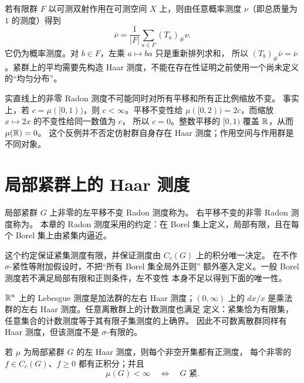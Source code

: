 \begin{example}[有限群平均]
若有限群 $F$ 以可测双射作用在可测空间 $X$ 上，则由任意概率测度
$\nu$（即总质量为 $1$ 的测度）得到
\[
 \overline\nu=\frac1{|F|}\sum_{a\in F}(T_a)_\#\nu.
\]
它仍为概率测度。对 $b\in F$，左乘 $a\mapsto ba$ 只是重新排列求和，
所以 $(T_b)_\#\overline\nu=\overline\nu$。紧群上的平均需要先构造
Haar 测度，不能在存在性证明之前使用一个尚未定义的“均匀分布”。
\end{example}

\begin{counterexample}[仿射作用的限制]
实直线上的非零 Radon 测度不可能同时对所有平移和所有正比例缩放不变。
事实上，若 $c=\mu([0,1))$，则 $c<\infty$。平移不变性给
$\mu([0,2))=2c$，而缩放 $x\mapsto2x$ 的不变性给同一数值为 $c$，
所以 $c=0$。整数平移的 $[0,1)$ 覆盖 $\mathbb{R}$，从而 $\mu(\mathbb{R})=0$。
这个反例并不否定仿射群自身存在 Haar 测度；作用空间与作用群是不同对象。
\end{counterexample}

\section{局部紧群上的 Haar 测度}
\label{sec:haar-measure-definition}

\begin{definition}
局部紧群 $G$ 上非零的左平移不变 Radon 测度称为。
右平移不变的非零 Radon 测度称为。
本章的 Radon 测度采用的约定：在
Borel 集上定义，局部有限，且在每个 Borel 集上由紧集内逼近。
\end{definition}

这个约定保证紧集测度有限，并保证测度由 $C_c(G)$ 上的积分唯一决定。
在不作 $\sigma$-紧性等附加假设时，不把“所有 Borel 集全局外正则”
额外塞入定义。一般 Borel 测度若不满足局部有限和正则条件，左不变性
本身不足以得到下面的唯一性。

\begin{example}
$\mathbb{R}^n$ 上的 Lebesgue 测度是加法群的左右 Haar 测度；$(0,\infty)$
上的 $dx/x$ 是乘法群的左右 Haar 测度。任意离散群上的计数测度也满足
定义：紧集恰为有限集，任意集合的计数测度等于其有限子集测度的上确界。
因此不可数离散群同样有 Haar 测度，但该测度不是 $\sigma$-有限的。
\end{example}

\begin{proposition}[正性与总质量]
\label{prop:haar-positive-open-compact-total}
若 $\mu$ 为局部紧群 $G$ 的左 Haar 测度，则每个非空开集都有正测度，
每个非零的 $f\in C_c(G)$、$f\ge0$ 都有正积分；并且
\[
 \mu(G)<\infty\quad\Longleftrightarrow\quad G\text{ 紧}.
\]
\end{proposition}

